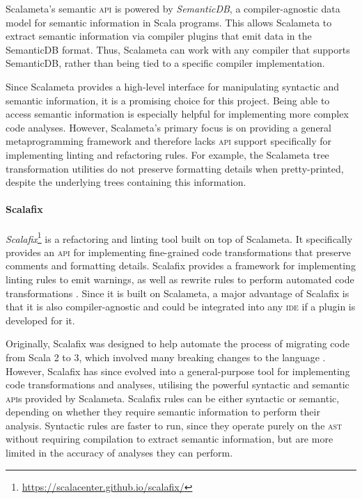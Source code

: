 Scalameta's semantic \textsc{api} is powered by \textit{SemanticDB}, a compiler-agnostic data model for semantic information in Scala programs.
This allows Scalameta to extract semantic information via compiler plugins that emit data in the SemanticDB format.
Thus, Scalameta can work with any compiler that supports SemanticDB, rather than being tied to a specific compiler implementation.

Since Scalameta provides a high-level interface for manipulating syntactic and semantic information, it is a promising choice for this project.
Being able to access semantic information is especially helpful for implementing more complex code analyses.
However, Scalameta's primary focus is on providing a general metaprogramming framework and therefore lacks \textsc{api} support specifically for implementing linting and refactoring rules.
For example, the Scalameta tree transformation utilities do not preserve formatting details when pretty-printed, despite the underlying trees containing this information.

\paragraph{Scalafix}
\textit{Scalafix}\footnote{\url{https://scalacenter.github.io/scalafix/}} is a refactoring and linting tool built on top of Scalameta.
It specifically provides an \textsc{api} for implementing fine-grained code transformations that preserve comments and formatting details.
Scalafix provides a framework for implementing linting rules to emit warnings, as well as rewrite rules to perform automated code transformations \cite{geirsson_catch_2017}.
Since it is built on Scalameta, a major advantage of Scalafix is that it is also compiler-agnostic and could be integrated into any \textsc{ide} if a plugin is developed for it.

Originally, Scalafix was designed to help automate the process of migrating code from Scala 2 to 3, which involved many breaking changes to the language \cite{geirsson_scalafix_2016}.
However, Scalafix has since evolved into a general-purpose tool for implementing code transformations and analyses, utilising the powerful syntactic and semantic \textsc{api}s provided by Scalameta.
Scalafix rules can be either syntactic or semantic, depending on whether they require semantic information to perform their analysis.
Syntactic rules are faster to run, since they operate purely on the \textsc{ast} without requiring compilation to extract semantic information, but are more limited in the accuracy of analyses they can perform.

